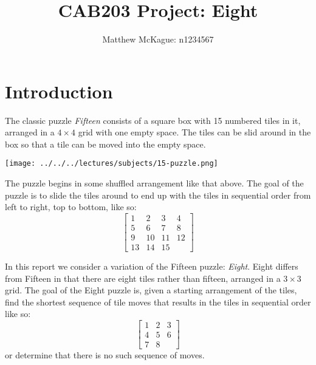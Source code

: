 \documentclass[a4paper]{article}
\author{Matthew McKague: n1234567}
\title{CAB203 Project: Eight}
\date{}
\begin{document}
\maketitle

\section{Introduction}
The classic puzzle \emph{Fifteen} consists of a square box with 15 numbered tiles in it, arranged in a $4 \times 4$ grid with one empty space.  The tiles can be slid around in the box so that a tile can be moved into the empty space.

\begin{center}
\texttt{[image: ../../../lectures/subjects/15-puzzle.png]}
\end{center}
The puzzle begins in some shuffled arrangement like that above.  The goal of the puzzle is to slide the tiles around to end up with the tiles in sequential order from left to right, top to bottom, like so:
\[\left[
   \begin{array}{cccc}
      1 & 2 & 3 & 4 \\
      5 & 6 & 7 & 8 \\
      9 & 10 & 11 & 12 \\
      13 & 14 & 15
   \end{array}
   \right]
\]

In this report we consider a variation of the Fifteen puzzle: \emph{Eight}.  Eight differs from Fifteen in that there are eight tiles rather than fifteen, arranged in a $3 \times 3$ grid.  The goal of the Eight puzzle is, given a starting arrangement of the tiles, find the shortest sequence of tile moves that results in the tiles in sequential order like so:
\[\left[
   \begin{array}{ccc}
      1 & 2 & 3 \\
      4 & 5 & 6 \\
      7 & 8
   \end{array}
   \right]
\]
or determine that there is no such sequence of moves.
\end{document}
